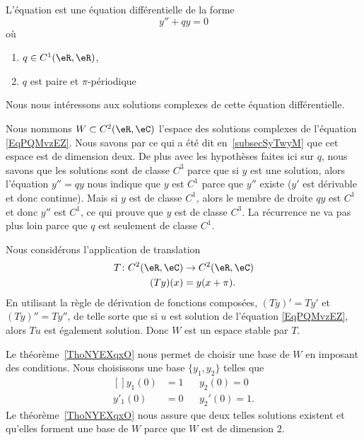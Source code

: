 L'équation  est une équation différentielle de la forme
\begin{equation}    \label{EqPQMvzEZ}
	y''+qy=0
\end{equation}
où
\begin{enumerate}
	\item
	      \( q\in C^1(\eR,\eR)\),
	\item
	      \( q\) est paire et \( \pi\)-périodique
\end{enumerate}
Nous nous intéressons aux solutions complexes de cette équation différentielle.

Nous nommons \( W\subset C^2(\eR,\eC)\) l'espace des solutions complexes de l'équation \eqref{EqPQMvzEZ}. Nous savons par ce qui a été dit en~\ref{subsecSyTwyM} que cet espace est de dimension deux. De plus avec les hypothèses faites ici sur \( q\), nous savons que les solutions sont de classe \( C^3\) parce que si \( y\) est une solution, alors l'équation \( y''=qy\) nous indique que \( y\) est \( C^1\) parce que \( y''\) existe (\( y'\) est dérivable et donc continue). Mais si \( y\) est de classe \( C^1\), alors le membre de droite \( qy\) est \( C^1\) et donc \( y''\) est \( C^1\), ce qui prouve que \( y\) est de classe \( C^3\). La récurrence ne va pas plus loin parce que \( q\) est seulement de classe \( C^1\).

Nous considérons l'application de translation
\begin{equation}
	\begin{aligned}
		T\colon C^2(\eR,\eC) & \to C^2(\eR,\eC) \\
		(Ty)(x)              & =y(x+\pi).
	\end{aligned}
\end{equation}
En utilisant la règle de dérivation de fonctions composées, \( (Ty)'=Ty'\) et \( (Ty)''=Ty''\), de telle sorte que si \( u\) est solution de l'équation \eqref{EqPQMvzEZ}, alors \( Tu\) est également solution. Donc \( W\) est un espace stable par \( T\).

Le théorème~\ref{ThoNYEXqxO} nous permet de choisir une base de \( W\) en imposant des conditions. Nous choisissons une base \( \{ y_1,y_2 \}\) telles que
\begin{equation}
	\begin{aligned}[]
		y_1(0)  & =1 &  & y_2(0)=0   \\
		y'_1(0) & =0 &  & y_2'(0)=1.
	\end{aligned}
\end{equation}
Le théorème~\ref{ThoNYEXqxO} nous assure que deux telles solutions existent et qu'elles forment une base de \( W\) parce que \( W\) est de dimension \( 2\).

